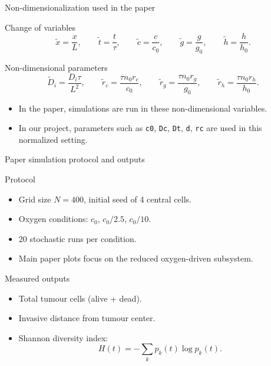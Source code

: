 \documentclass[10pt,aspectratio=169]{beamer}
\begin{document}
\begin{frame}[c]{Non-dimensionalization used in the paper}
\small
\begin{block}{Change of variables}
\[
\tilde{x}=\frac{x}{L},\qquad
\tilde{t}=\frac{t}{\tau},\qquad
\tilde{c}=\frac{c}{c_0},\qquad
\tilde{g}=\frac{g}{g_0},\qquad
\tilde{h}=\frac{h}{h_0}.
\]
\end{block}

\begin{block}{Non-dimensional parameters}
\[
\tilde{D}_i=\frac{D_i\tau}{L^2},\qquad
\tilde{r}_c=\frac{\tau n_0 r_c}{c_0},\qquad
\tilde{r}_g=\frac{\tau n_0 r_g}{g_0},\qquad
\tilde{r}_h=\frac{\tau n_0 r_h}{h_0}.
\]
\begin{itemize}
  \item In the paper, simulations are run in these non-dimensional variables.
  \item In our project, parameters such as \texttt{c0}, \texttt{Dc}, \texttt{Dt}, \texttt{d}, \texttt{rc} are used in this normalized setting.
\end{itemize}
\end{block}
\end{frame}

\begin{frame}[c]{Paper simulation protocol and outputs}
\begin{block}{Protocol}
\begin{itemize}
  \item Grid size $N=400$, initial seed of 4 central cells.
  \item Oxygen conditions: $c_0$, $c_0/2.5$, $c_0/10$.
  \item 20 stochastic runs per condition.
  \item Main paper plots focus on the reduced oxygen-driven subsystem.
\end{itemize}
\end{block}

\begin{block}{Measured outputs}
\begin{itemize}
  \item Total tumour cells (alive + dead).
  \item Invasive distance from tumour center.
  \item Shannon diversity index:
  \[
  H(t)=-\sum_k p_k(t)\log p_k(t).
  \]
\end{itemize}
\end{block}
\end{frame}
\end{document}

